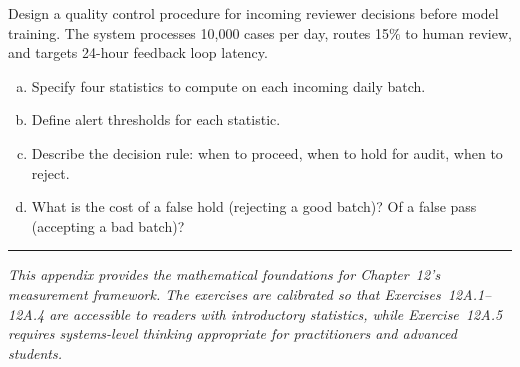 \begin{Exercise}
Design a quality control procedure for incoming reviewer decisions before model training. The system processes 10,000 cases per day, routes 15\% to human review, and targets 24-hour feedback loop latency.
\begin{enumerate}[(a)]
    \item Specify four statistics to compute on each incoming daily batch.
    \item Define alert thresholds for each statistic.
    \item Describe the decision rule: when to proceed, when to hold for audit, when to reject.
    \item What is the cost of a false hold (rejecting a good batch)? Of a false pass (accepting a bad batch)?
\end{enumerate}
\end{Exercise}

\bigskip
\begin{center}
\rule{0.5\textwidth}{0.4pt}
\end{center}
\bigskip

\noindent\textit{This appendix provides the mathematical foundations for Chapter~12's measurement framework. The exercises are calibrated so that Exercises~12A.1--12A.4 are accessible to readers with introductory statistics, while Exercise~12A.5 requires systems-level thinking appropriate for practitioners and advanced students.}
\apxnumoff
